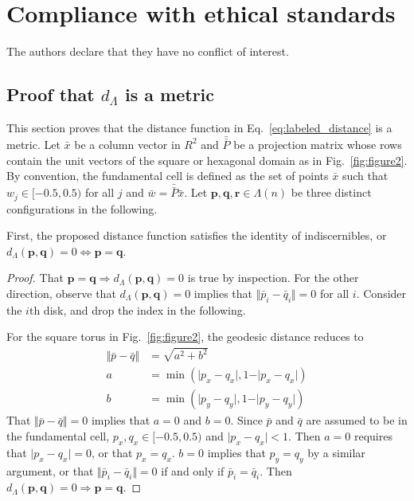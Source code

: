 \documentclass[default,iicol]{sn-jnl}%
\theoremstyle{thmstyleone}%
\theoremstyle{thmstyletwo}%
\theoremstyle{thmstylethree}%
\renewcommand{\vec}[1]{\bar{#1}}
\providecommand{\mat}[1]{\bar{\bar{#1}}}
\providecommand{\config}[1]{\mathbf{#1}}
\begin{document}
\section*{Compliance with ethical standards}

 The  authors  declare  that  they  have  no  conflict  of interest.

\begin{appendices}
	
	\section{Proof that $d_\Lambda$ is a metric}
	\label{sec:metric_proofs}
	
	This section proves that the distance function in Eq.\ \ref{eq:labeled_distance} is a metric. Let $\vec{x}$ be a column vector in $R^2$ and $\mat{P}$ be a projection matrix whose rows contain the unit vectors of the square or hexagonal domain as in Fig.\ \ref{fig:figure2}. By convention, the fundamental cell is defined as the set of points $\vec{x}$ such that $w_j \in [-0.5, 0.5)$ for all $j$ and $\vec{w} = \mat{P} \vec{x}$. Let $\config{p}, \config{q}, \config{r} \in \Lambda(n)$ be three distinct configurations in the following.

	First, the proposed distance function satisfies the identity of indiscernibles, or $d_\Lambda(\config{p},\config{q}) = 0 \iff \config{p} = \config{q}$.
	
	\begin{proof}
		That $\config{p} = \config{q} \Longrightarrow d_\Lambda(\config{p},\config{q}) = 0$ is true by inspection. For the other direction, observe that $d_\Lambda(\config{p}, \config{q}) = 0$ implies that $\Vert \vec{p}_i - \vec{q}_i \Vert = 0$ for all $i$. Consider the $i$th disk, and drop the index in the following. 
		
		For the square torus in Fig.\ \ref{fig:figure2}, the geodesic distance reduces to
		\begin{align*}
			\Vert \vec{p} - \vec{q} \Vert &= \sqrt{a^2 + b^2} \nonumber \\
			a &= \min{(\rvert p_x - q_x \lvert, 1 - \rvert p_x - q_x \lvert)} \nonumber \\
			b &= \min{(\rvert p_y - q_y \lvert, 1 - \rvert p_y - q_y \lvert)}  \label{eq:app_formula_1}
		\end{align*}
		That $\Vert \vec{p} - \vec{q} \Vert = 0$ implies that $a = 0$ and $b = 0$. Since $\vec{p}$ and $\vec{q}$ are assumed to be in the fundamental cell, $p_x, q_x \in [-0.5, 0.5)$ and $\lvert p_x - q_x \rvert < 1$. Then $a = 0$ requires that $\lvert p_x - q_x \rvert = 0$, or that $p_x = q_x$. $b = 0$ implies that $p_y = q_y$ by a similar argument, or that $\Vert \vec{p}_i - \vec{q}_i \Vert = 0$ if and only if $\vec{p}_i = \vec{q}_i$. Then $d_\Lambda(\config{p}, \config{q}) = 0 \Longrightarrow \config{p} = \config{q}$.
		

\end{proof}
\end{appendices}
\end{document}

